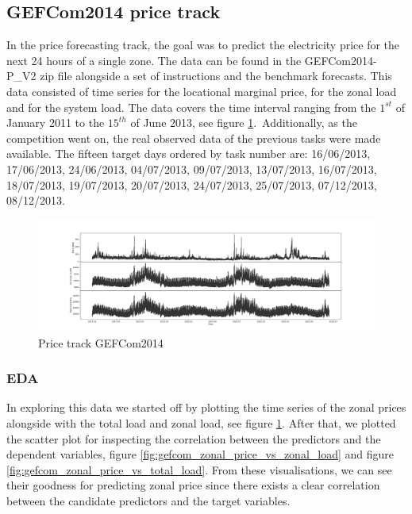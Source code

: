 \subsection{GEFCom2014 price track}
In the price forecasting track, the goal was to predict the electricity price for the next 24 hours of a single zone. 
The data can be found in the GEFCom2014-P\_V2 zip file alongside a set of instructions and the benchmark forecasts.
This data consisted of time series for the locational marginal price, for the zonal load and for the system load. The data covers the time interval ranging from the $1^{st}$ of January 2011 to the $15^{th}$ of June 2013, see figure \ref{fig:price_track_fig1}.\ 
Additionally, as the competition went on, the real observed data of the previous tasks were made available.
The fifteen target days ordered by task number are: 16/06/2013, 17/06/2013, 24/06/2013, 04/07/2013, 09/07/2013, 13/07/2013, 16/07/2013, 18/07/2013, 19/07/2013, 20/07/2013, 24/07/2013, 25/07/2013, 07/12/2013, 08/12/2013. 
\begin{figure}[!h]
    \includegraphics[width=\textwidth]{images/price_track_fig1.png}
    \caption{Price track GEFCom2014}
    \label{fig:price_track_fig1}
\end{figure}
\subsubsection{EDA}
In exploring this data we started off by plotting the time series of the zonal prices alongside with the total load and zonal load, see figure \ref{fig:price_track_fig1}.
After that, we plotted the scatter plot for inspecting the correlation between the predictors and the dependent variables, figure \ref{fig:gefcom_zonal_price_vs_zonal_load} and figure \ref{fig:gefcom_zonal_price_vs_total_load}. From these visualisations, we can see their goodness for predicting zonal price since there exists a clear correlation between the candidate predictors and the target variables.

